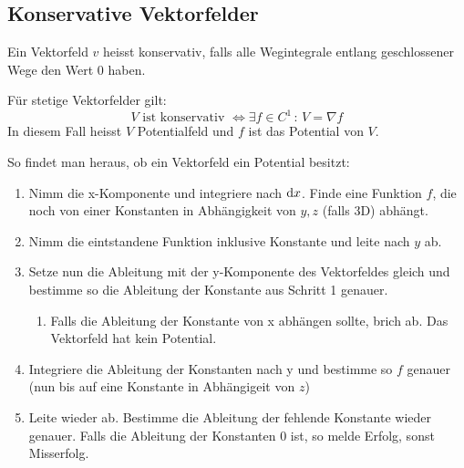 	\subsection{Konservative Vektorfelder}
	 	\begin{definition}
		 	Ein Vektorfeld $v$ heisst konservativ, falls alle Wegintegrale entlang geschlossener Wege den Wert 0 haben.
		 \end{definition}
		 \begin{theorem}
		 	Für stetige Vektorfelder gilt:
		 	$$ V \text{ ist konservativ } \Leftrightarrow \exists f \in C^1 \, : \, V = \nabla f$$
		 	In diesem Fall heisst $V$ Potentialfeld und $f$ ist das Potential von $V$.
		 \end{theorem}
		 \begin{proofhelp}
		 	So findet man heraus, ob ein Vektorfeld ein Potential besitzt: 
		 	\begin{enumerate}
		 		\item Nimm die x-Komponente und integriere nach $\mathrm{d} x$. Finde eine Funktion $f$, die noch von einer Konstanten in Abhängigkeit von $y,z$ (falls 3D) abhängt.
		 		\item Nimm die eintstandene Funktion inklusive Konstante und leite nach $y$ ab.
		 		\item Setze nun die Ableitung mit der y-Komponente des Vektorfeldes gleich und bestimme so die Ableitung der Konstante aus Schritt 1 genauer.
		 		\begin{enumerate}
		 			\item Falls die Ableitung der Konstante von x abhängen sollte, brich ab. Das Vektorfeld hat kein Potential.
		 		\end{enumerate}
		 		\item Integriere die Ableitung der Konstanten nach y und bestimme so $f$ genauer (nun bis auf eine Konstante in Abhängigeit von $z$)
		 		\item Leite wieder ab. Bestimme die Ableitung der fehlende Konstante wieder genauer. Falls die Ableitung der Konstanten 0 ist, so melde Erfolg, sonst Misserfolg.
		 	\end{enumerate}
		 \end{proofhelp}
